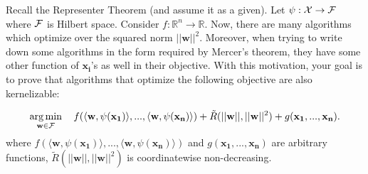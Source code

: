 Recall the Representer Theorem (and assume it as a given). Let $\psi:\cal X \rightarrow \cal F$ where $\cal F$ is Hilbert space. Consider $f : \mathbb{R}^n \rightarrow \mathbb{R}$. Now, there are many algorithms which optimize over the squared norm $||\mathbf{w}||^2$. Moreover, when trying to write down some algorithms in the form required by Mercer's theorem, they have some other function of $\mathbf{x_i}$'s as well in their objective. With this motivation, your goal is to prove that algorithms that optimize  the following objective are also kernelizable:

\begin{equation*}
    \operatorname*{arg\,min}_{\mathbf{w} \in \cal F}~~~ f(\langle \mathbf{w}, \psi(\mathbf{x_1}) \rangle,..., \langle \mathbf{w}, \psi(\mathbf{x_n}) \rangle) + \tilde{R}(||\mathbf{w}||,||\mathbf{w}||^2) + g(\mathbf{x_1},...,\mathbf{x_n}).
\end{equation*}
 where $f(\langle \mathbf{w}, \psi(\mathbf{x_1}) \rangle,..., \langle \mathbf{w}, \psi(\mathbf{x_n}) \rangle)$ and $g(\mathbf{x_1},...,\mathbf{x_n})$ are arbitrary functions, $\tilde{R}(||\mathbf{w}||,||\mathbf{w}||^2)$ is coordinatewise non-decreasing.

